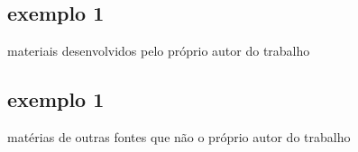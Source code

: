 \documentclass[
12pt,				%
openany,			%
oneside,			%
a4paper,			%
english,			%
french,				%
spanish,			%
brazil				%
]{abntex2}
\begin{document}
	
	
	
	\begin{apendicesenv}
		
		\partapendices
		
		\chapter{exemplo 1}
		
		materiais desenvolvidos pelo próprio autor do trabalho
		
	\end{apendicesenv}
	
	
	\begin{anexosenv}
		
		\partanexos
		
		\chapter{exemplo 1}
		matérias de outras fontes que não o próprio autor do trabalho
		
	\end{anexosenv}
	
	\printindex
	
\end{document}
